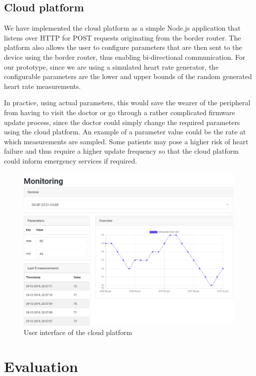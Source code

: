 \documentclass[12pt, a4paper]{article}
\begin{document}
\subsection{Cloud platform}
\label{ssec:cloud-platform}

We have implemented the cloud platform as a simple Node.js application that listens over HTTP for POST requests originating from the border router. The platform also allows the user to configure parameters that are then sent to the device using the border router, thus enabling bi-directional communication. For our prototype, since we are using a simulated heart rate generator, the configurable parameters are the lower and upper bounds of the random generated heart rate measurements.

In practice, using actual parameters, this would save the wearer of the peripheral from having to visit the doctor or go through a rather complicated firmware update process, since the doctor could simply change the required parameters using the cloud platform. An example of a parameter value could be the rate at which measurements are sampled. Some patients may pose a higher risk of heart failure and thus require a higher update frequency so that the cloud platform could inform emergency services if required.

\begin{figure}[htbp]
	\includegraphics[width=\textwidth]{images/cloud-platform.png}
	\centering
	\caption{User interface of the cloud platform}
\end{figure}

\section{Evaluation}
\label{sec:eval}
\end{document}
